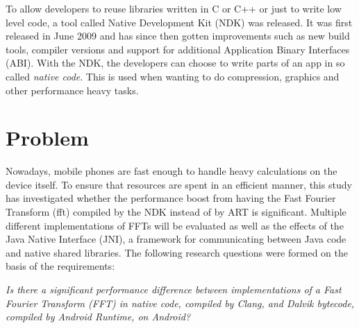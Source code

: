 To allow developers to reuse libraries written in C or C++ or just to write low level code, a tool called Native Development Kit (NDK) was released. It was first released in June 2009 \cite{Lin2011} and has since then gotten improvements such as new build tools, compiler versions and support for additional Application Binary Interfaces (ABI). With the NDK, the developers can choose to write parts of an app in so called \emph{native code}. This is used when wanting to do compression, graphics and other performance heavy tasks.



\section{Problem}
Nowadays, mobile phones are fast enough to handle heavy calculations on the device itself. To ensure that resources are spent in an efficient manner, this study has investigated whether the performance boost from having the Fast Fourier Transform (\gls{fft}) compiled by the NDK instead of by ART is significant. Multiple different implementations of FFTs will be evaluated as well as the effects of the Java Native Interface (JNI), a framework for communicating between Java code and native shared libraries. The following research questions were formed on the basis of the requirements:



\begin{center}
    \textit{Is there a significant performance difference between implementations of a Fast Fourier Transform (FFT) in native code, compiled by Clang, and Dalvik bytecode, compiled by Android Runtime, on Android?}
\end{center}


